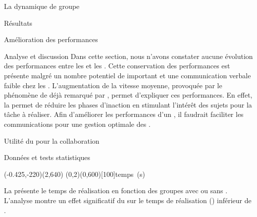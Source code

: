 \documentclass[myfrancais,ngerman,english,french]{mythesis}
\begin{document}
\begin{mychapter}{La dynamique de groupe}
\begin{mysection}{Résultats}
\begin{mysubsection}{Amélioration des performances}
\begin{mysubsubsection}{Analyse et discussion}
					Dans cette section, nous n'avons constater aucune évolution des performances entre les  et les .
					Cette conservation des performances est présente malgré un nombre potentiel de  important et une communication verbale faible chez les .
					L'augmentation de la vitesse moyenne, provoquée par le phénomène de  déjà remarqué par , permet d'expliquer ces performances.
					En effet, la  permet de réduire les phases d'inaction en stimulant l'intérêt des sujets pour la tâche à réaliser.
					Afin d'améliorer les performances d'un , il faudrait faciliter les communications pour une gestion optimale des .
				\end{mysubsubsection}
			\end{mysubsection}
			\begin{mysubsection}{Utilité du \mybrainstorming pour la collaboration}
				\begin{mysubsubsection}{Données et tests statistiques}
					\begin{myfigure}
						\begin{myps}(-0.425,-220)(2,640)
							\myaxes(0,2){\mybrainstorming}(0,600)[100]{temps~(s)}
						\end{myps}
					\end{myfigure}

					La  présente le temps de réalisation  en fonction des groupes avec ou sans \mybrainstorming {}.
					L'analyse montre un effet significatif du \mybrainstorming {} sur le temps de réalisation  () inférieur de .


\end{mysubsubsection}
\end{mysubsection}
\end{mysection}
\end{mychapter}
\end{document}
